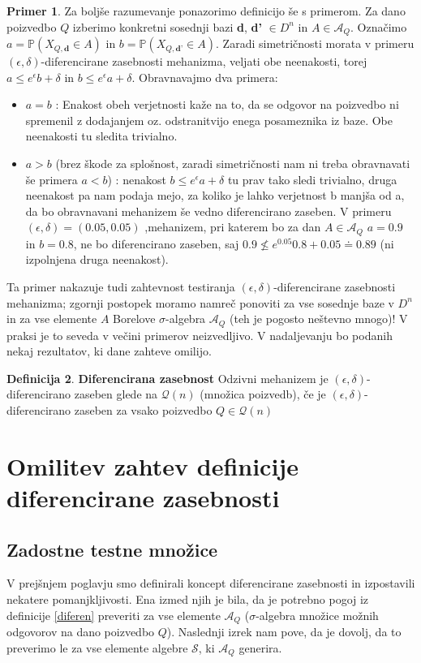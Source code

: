 \documentclass[12pt,a4paper]{amsart}
\theoremstyle{definition} %
\newtheorem{definicija}{Definicija}[section]
\newtheorem{primer}[definicija]{Primer}
\theoremstyle{plain} %
\begin{document}
\begin{primer}
Za boljše razumevanje ponazorimo definicijo še s primerom. Za dano poizvedbo $Q$ izberimo konkretni sosednji bazi \textbf{d}, \textbf{d'} $\in D^n$ in $A\in \mathcal{A}_{Q}$. Označimo $a = \mathbb{P}(X_{Q,\textbf{d}}\in A)$ in $b = \mathbb{P}(X_{Q,\textbf{d'}}\in A)$. Zaradi simetričnosti morata v primeru $(\epsilon, \delta)$-diferencirane zasebnosti mehanizma, veljati obe neenakosti, torej $a \leq e^{\epsilon}b+\delta$ in $b \leq e^{\epsilon}a+\delta$. Obravnavajmo dva primera:
\begin{itemize}
\item $a=b$ : Enakost obeh verjetnosti kaže na to, da se odgovor na poizvedbo ni spremenil z dodajanjem oz. odstranitvijo enega posameznika iz baze. Obe neenakosti tu sledita trivialno.
\item $a>b$ (brez škode za splošnost, zaradi simetričnosti nam ni treba obravnavati še primera $a<b$) : nenakost $b \leq e^{\epsilon}a+\delta$ tu prav tako sledi trivialno, druga neenakost pa nam podaja mejo, za koliko je lahko verjetnost b manjša od a, da bo obravnavani mehanizem še vedno diferencirano zaseben. V primeru $(\epsilon, \delta) = (0.05, 0.05)$ ,mehanizem, pri katerem bo za dan $A \in \mathcal{A}_{Q}$ $a=0.9$ in $b=0.8$, ne bo diferencirano zaseben, saj $0.9 \nleq e^{0.05} 0.8 + 0.05 \doteq 0.89$ (ni izpolnjena druga neenakost).
\end{itemize}
Ta primer nakazuje tudi zahtevnost testiranja $(\epsilon, \delta)$-diferencirane zasebnosti mehanizma; zgornji postopek moramo namreč ponoviti za vse sosednje baze v $D^n$ in za vse elemente $A$ Borelove $\sigma$-algebra $\mathcal{A}_Q$ (teh je pogosto neštevno mnogo)! V praksi je to seveda v večini primerov neizvedljivo. V nadaljevanju bo podanih nekaj rezultatov, ki dane zahteve omilijo.
\end{primer}


\begin{definicija} {\textbf{Diferencirana zasebnost}}
Odzivni mehanizem je $(\epsilon, \delta)$-diferencirano zaseben glede na $\mathcal{Q}(n)$ (množica poizvedb), če je $(\epsilon, \delta)$-diferencirano zaseben za vsako poizvedbo $Q \in \mathcal{Q}(n)$
\end{definicija}

\section{Omilitev zahtev definicije diferencirane zasebnosti}
\subsection{Zadostne testne množice}
V prejšnjem poglavju smo definirali koncept diferencirane zasebnosti in izpostavili nekatere pomanjkljivosti. Ena izmed njih je bila, da je potrebno pogoj iz definicije \eqref{diferen} preveriti za vse elemente $\mathcal{A}_Q$ ($\sigma$-algebra množice možnih odgovorov na dano poizvedbo $Q$). Naslednji izrek nam pove, da je dovolj, da to preverimo le za vse elemente algebre $\mathcal{S}$, ki $\mathcal{A}_Q$ generira.
\end{document}
